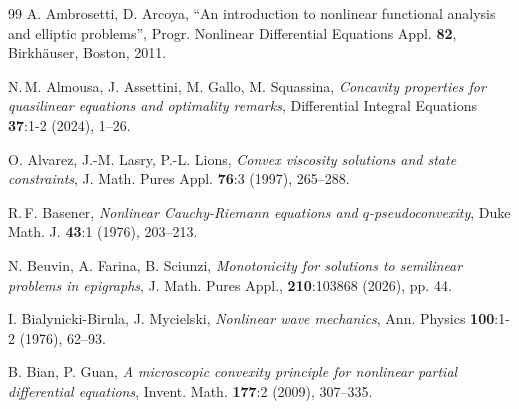 \documentclass[12pt]{amsart}
\numberwithin{equation}{section}
\theoremstyle{plain}
\theoremstyle{plain}
\theoremstyle{plain}
\theoremstyle{definition}
\begin{document}
\begin{thebibliography}{99}
%
A. Ambrosetti, D. Arcoya,
``An introduction to nonlinear functional analysis and elliptic problems'',
Progr. Nonlinear Differential Equations Appl. \textbf{82}, Birkhäuser, Boston, 2011.

N.$\,$M. Almousa, J. Assettini, M. Gallo, M. Squassina, 
\emph{Concavity properties for quasilinear equations and optimality remarks}, 
Differential Integral Equations \textbf{37}:1-2 (2024), 1--26.

O. Alvarez, J.-M. Lasry, P.-L. Lions,
\emph{Convex viscosity solutions and state constraints},
J. Math. Pures Appl. \textbf{76}:3 (1997), 265--288.


R.$\,$F. Basener,
\emph{Nonlinear Cauchy-Riemann equations and $q$-pseudoconvexity},
Duke Math. J. \textbf{43}:1 (1976), 203--213.


N. Beuvin, A. Farina, B. Sciunzi,
\emph{Monotonicity for solutions to semilinear problems in epigraphs},
J. Math. Pures Appl., \textbf{210}:103868 (2026), pp. 44. 


I. Bialynicki-Birula, J. Mycielski,
\emph{Nonlinear wave mechanics},
Ann. Physics \textbf{100}:1-2 (1976), 62--93. 


B. Bian, P. Guan,
\emph{A microscopic convexity principle for nonlinear partial differential equations},
Invent. Math. \textbf{177}:2 (2009), 307--335.


\end{thebibliography}
\end{document}

